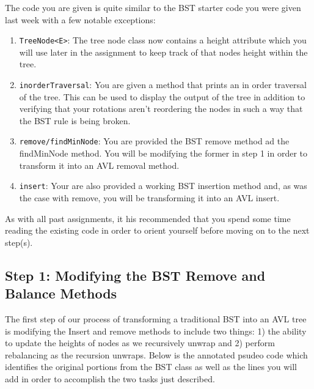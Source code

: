\documentclass[a4paper]{article}
\begin{document}
The code you are given is quite similar to the BST starter code you were given last week with a few notable exceptions:
\begin{enumerate}
	\item \lstinline|TreeNode<E>|: The tree node class now contains a height attribute which you will use later in the assignment to keep track of that nodes height within the tree.
	\item \lstinline|inorderTraversal|: You are given a method that prints an in order traversal of the tree. This can be used to display the output of the tree in addition to verifying that your rotations aren't reordering the nodes in such a way that the BST rule is being broken.
	\item \lstinline|remove/findMinNode|: You are provided the BST remove method ad the findMinNode method. You will be modifying the former in step 1 in order to transform it into an AVL removal method.
	\item \lstinline|insert|: Your are also provided a working BST insertion method and, as was the case with remove, you will be transforming it into an AVL insert.
\end{enumerate}

As with all past assignments, it his recommended that you spend some time
reading the existing code in order to orient yourself before moving on to
the next step(s).

\subsection{Step 1: Modifying the BST Remove and Balance Methods}

The first step of our process of transforming a traditional BST into an AVL
tree is modifying the Insert and remove methods to include two things: 1) the
ability to update the heights of nodes as we recursively unwrap and 2) perform
rebalancing as the recursion unwraps. Below is the annotated psudeo code which
identifies the original portions from the BST class as well as the lines you
will add in order to accomplish the two tasks just described.
\end{document}
